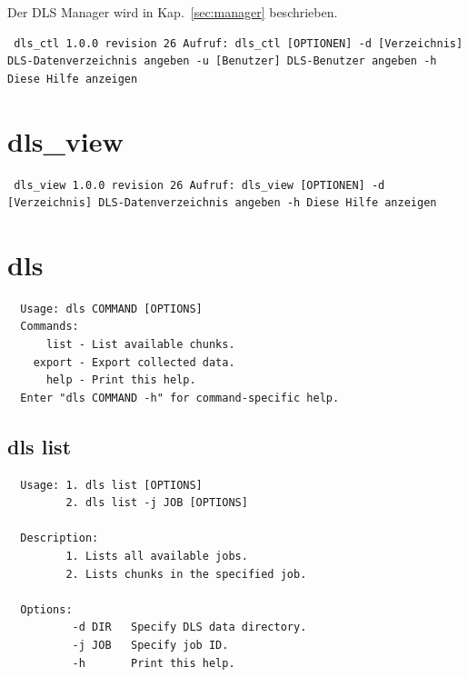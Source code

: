 \documentclass[a4paper,12pt,BCOR6mm,bibtotoc,idxtotoc]{scrbook}
\begin{document}
Der DLS Manager wird in Kap.~\ref{sec:manager} beschrieben.

\begin{lstlisting} dls_ctl 1.0.0 revision 26 Aufruf: dls_ctl [OPTIONEN] -d [Verzeichnis] DLS-Datenverzeichnis angeben -u [Benutzer] DLS-Benutzer angeben -h Diese Hilfe anzeigen \end{lstlisting}


\section{dls\_view} 

\begin{lstlisting} dls_view 1.0.0 revision 26 Aufruf: dls_view [OPTIONEN] -d [Verzeichnis] DLS-Datenverzeichnis angeben -h Diese Hilfe anzeigen \end{lstlisting}


\section{dls} \label{sec:apx_cmd_dls} 

\begin{lstlisting}
  Usage: dls COMMAND [OPTIONS]
  Commands:
      list - List available chunks.
    export - Export collected data.
      help - Print this help.
  Enter "dls COMMAND -h" for command-specific help.
\end{lstlisting}


\subsection{dls list}

\begin{lstlisting}
  Usage: 1. dls list [OPTIONS]
         2. dls list -j JOB [OPTIONS]

  Description:
         1. Lists all available jobs.
         2. Lists chunks in the specified job.

  Options:
          -d DIR   Specify DLS data directory.
          -j JOB   Specify job ID.
          -h       Print this help.
\end{lstlisting}
\end{document}
